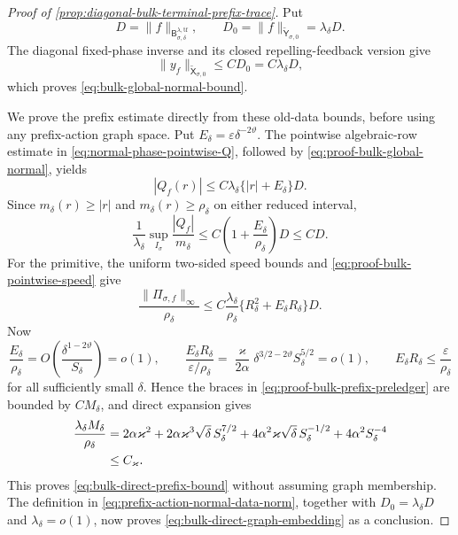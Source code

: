 \begin{proof}[Proof of
\cref{prop:diagonal-bulk-terminal-prefix-trace}]
Put
\[
 D=\|f\|_{\mathsf B_{\sigma,\delta}^{\lambda,\mathrm{tf}}},
 \qquad D_0=\|f\|_{\widetilde{\mathsf Y}_{\sigma,0}}
             =\lambda_\delta D.
\]
The diagonal fixed-phase inverse and its closed repelling-feedback version
give
\begin{equation}
 \|y_f\|_{\widetilde{\mathsf X}_{\sigma,0}}
 \le CD_0=C\lambda_\delta D,                    \label{eq:proof-bulk-global-normal}
\end{equation}
which proves \cref{eq:bulk-global-normal-bound}.

We prove the prefix estimate directly from these old-data bounds, before
using any prefix-action graph space.  Put
\(E_\delta=\varepsilon\delta^{-2\vartheta}\).  The pointwise algebraic-row
estimate in \cref{eq:normal-phase-pointwise-Q}, followed by
\cref{eq:proof-bulk-global-normal}, yields
\begin{equation}
 |Q_f(r)|\le C\lambda_\delta
       \{|r|+E_\delta\}D.                       \label{eq:proof-bulk-pointwise-speed}
\end{equation}
Since \(m_\delta(r)\ge|r|\) and
\(m_\delta(r)\ge\rho_\delta\) on either reduced interval,
\begin{equation}
 \frac1{\lambda_\delta}
  \sup_{I_\sigma}\frac{|Q_f|}{m_\delta}
 \le C\left(1+\frac{E_\delta}{\rho_\delta}\right)D
 \le CD.                                        \label{eq:proof-bulk-weighted-speed}
\end{equation}
For the primitive, the uniform two-sided speed bounds and
\cref{eq:proof-bulk-pointwise-speed} give
\begin{equation}
 \frac{\|\Pi_{\sigma,f}\|_\infty}{\rho_\delta}
 \le C\frac{\lambda_\delta}{\rho_\delta}
       \{R_\delta^2+E_\delta R_\delta\}D.       \label{eq:proof-bulk-prefix-preledger}
\end{equation}
Now
\begin{equation}
 \frac{E_\delta}{\rho_\delta}
 =O\left(\frac{\delta^{1-2\vartheta}}{S_\delta}\right)=o(1),
 \qquad
 \frac{E_\delta R_\delta}{\varepsilon/\rho_\delta}
 =\frac{\varkappa}{2\alpha}
    \delta^{3/2-2\vartheta}S_\delta^{5/2}=o(1),
 \qquad E_\delta R_\delta\le\frac{\varepsilon}{\rho_\delta}
                                                        \label{eq:proof-bulk-cap-scale}
\end{equation}
for all sufficiently small \(\delta\).  Hence the braces in
\cref{eq:proof-bulk-prefix-preledger} are bounded by \(CM_\delta\), and
direct expansion gives
\begin{align}
 \frac{\lambda_\delta M_\delta}{\rho_\delta}
 &=2\alpha\varkappa^2
   +2\alpha\varkappa^3\sqrt\delta\,S_\delta^{7/2}
   +4\alpha^2\varkappa\sqrt\delta\,S_\delta^{-1/2}
   +4\alpha^2S_\delta^{-4}\notag\\
 &\le C_\varkappa.                              \label{eq:proof-bulk-prefix-ratio}
\end{align}
This proves \cref{eq:bulk-direct-prefix-bound} without assuming graph
membership.  The definition in
\cref{eq:prefix-action-normal-data-norm}, together with
\(D_0=\lambda_\delta D\) and \(\lambda_\delta=o(1)\), now proves
\cref{eq:bulk-direct-graph-embedding} as a conclusion.


\end{proof}
